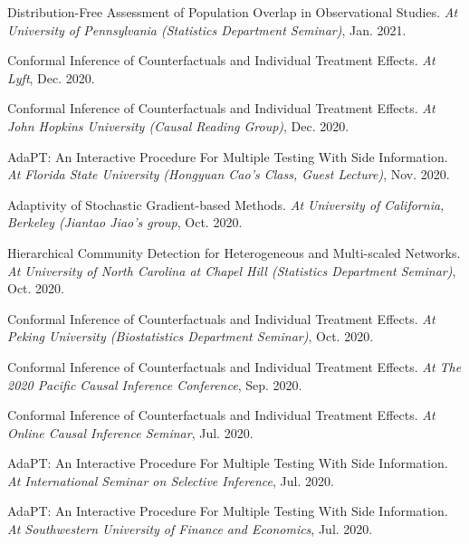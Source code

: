 \documentclass{article}
\begin{document}
\vspace{2mm}
Distribution-Free Assessment of Population Overlap in Observational Studies. \emph{At University of Pennsylvania (Statistics Department Seminar)}, Jan. 2021.

\vspace{2mm}
Conformal Inference of Counterfactuals and Individual Treatment Effects. \emph{At Lyft}, Dec. 2020.

\vspace{2mm}
Conformal Inference of Counterfactuals and Individual Treatment Effects. \emph{At John Hopkins University (Causal Reading Group)}, Dec. 2020.

\vspace{2mm}
AdaPT: An Interactive Procedure For Multiple Testing With Side Information. \emph{At Florida State University (Hongyuan Cao's Class, Guest Lecture)}, Nov. 2020. 

\vspace{2mm}
Adaptivity of Stochastic Gradient-based Methods. \emph{At University of California, Berkeley (Jiantao Jiao's group}, Oct. 2020. 

\vspace{2mm}
Hierarchical Community Detection for Heterogeneous and Multi-scaled Networks. \emph{At University of North Carolina at Chapel Hill (Statistics Department Seminar)}, Oct. 2020. 

\vspace{2mm}
Conformal Inference of Counterfactuals and Individual Treatment Effects. \emph{At Peking University (Biostatistics Department Seminar)}, Oct. 2020.

\vspace{2mm}
Conformal Inference of Counterfactuals and Individual Treatment Effects. \emph{At The 2020 Pacific Causal Inference Conference}, Sep. 2020.

\vspace{2mm}
Conformal Inference of Counterfactuals and Individual Treatment Effects. \emph{At Online Causal Inference Seminar}, Jul. 2020.

\vspace{2mm}
AdaPT: An Interactive Procedure For Multiple Testing With Side Information. \emph{At International Seminar on Selective Inference}, Jul. 2020. 

\vspace{2mm}
AdaPT: An Interactive Procedure For Multiple Testing With Side Information. \emph{At Southwestern University of Finance and Economics}, Jul. 2020. 
\end{document}
